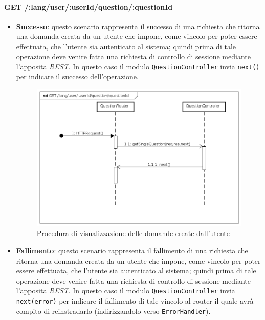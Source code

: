 \paragraph{GET /:lang/user/:userId/question/:questionId}
\begin{itemize}
\item \textbf{Successo}: questo scenario rappresenta il successo di una richiesta che ritorna una domanda creata da un utente che impone, come vincolo per poter essere effettuata, che l'utente sia autenticato al sistema; quindi prima di tale operazione deve venire fatta una richiesta di controllo di sessione mediante l'apposita \textit{REST}. In questo caso il modulo \texttt{QuestionController} invia \texttt{next()} per indicare il successo dell'operazione.


\begin{figure}[ht]
	\centering
	\includegraphics[scale=0.45]{UML/DiagrammiDiSequenza/Back-end/GET__lang_user__userId_question__questionId_success.png}
	\caption{Procedura di visualizzazione delle domande create dall'utente}
\end{figure}
\FloatBarrier

\item \textbf{Fallimento}: questo scenario rappresenta il fallimento di una richiesta che ritorna una domanda creata da un utente che impone, come vincolo per poter essere effettuata, che l'utente sia autenticato al sistema; quindi prima di tale operazione deve venire fatta una richiesta di controllo di sessione mediante l'apposita \textit{REST}. In questo caso il modulo \texttt{QuestionController} invia \texttt{next(error)} per indicare il fallimento di tale vincolo al router il quale avrà compito di reinstradarlo (indirizzandolo verso \texttt{ErrorHandler}).


\end{itemize}
